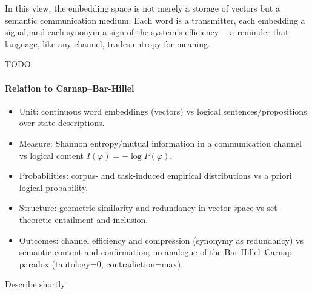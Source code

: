\documentclass[12pt,a4paper]{article}
\begin{document}
\vspace{1em}

In this view, the embedding space is not merely a storage of vectors but a 
semantic communication medium.  
Each word is a transmitter, each embedding a signal, and each synonym a sign of the system's efficiency---  
a reminder that language, like any channel, trades entropy for meaning.

TODO:
\paragraph*{Relation to Carnap–Bar-Hillel}
\begin{itemize}
\item Unit: continuous word embeddings (vectors) vs logical sentences/propositions over state-descriptions.
\item Measure: Shannon entropy/mutual information in a communication channel vs logical content \(I(\varphi) = -\log P(\varphi)\).
\item Probabilities: corpus- and task-induced empirical distributions vs a priori logical probability.
\item Structure: geometric similarity and redundancy in vector space vs set-theoretic entailment and inclusion.
\item Outcomes: channel efficiency and compression (synonymy as redundancy) vs semantic content and confirmation; no analogue of the Bar-Hillel–Carnap paradox (tautology=0, contradiction=max).
\end{itemize}
Describe shortly 
\end{document}
